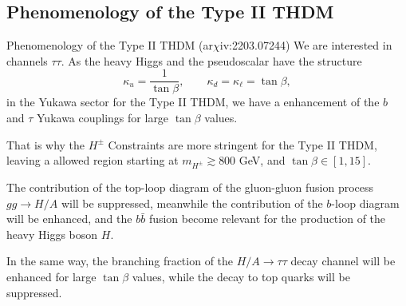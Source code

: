 \documentclass{../bredelebeamer}
\newcommand{\arxiv}{ar$\chi$iv:}
\begin{document}
\subsection{Phenomenology of the Type II THDM}
\begin{frame}{Phenomenology of the Type II THDM (\arxiv 2203.07244)}
    We are interested in channels $\tau \tau$. As the heavy Higgs and the pseudoscalar have the structure
    $$
    \kappa_u=\frac{1}{\tan\beta}, \qquad \kappa_d=\kappa_\ell=\tan\beta,
    $$
    in the Yukawa sector for the Type II THDM, we have a enhancement of the $b$ and $\tau$ Yukawa couplings for large $\tan\beta$ values.\vfill

    That is why the {$H^\pm$ Constraints} are more stringent for the Type II THDM, leaving a allowed region starting at $m_{H^\pm} \gtrsim 800$ GeV, and $\tan\beta \in [1, 15]$.\vfill

    The contribution of the top-loop diagram of the gluon-gluon fusion process $gg \rightarrow H / A$ will be suppressed, meanwhile the contribution of the $b$-loop diagram will be enhanced, and the $b\bar b$ fusion become relevant for the production of the heavy Higgs boson $H$. 
    \vfill

    In the same way, the branching fraction of the $H/A \rightarrow \tau \tau$ decay channel will be enhanced for large $\tan\beta$ values, while the decay to top quarks will be suppressed.
\end{frame}
\end{document}
